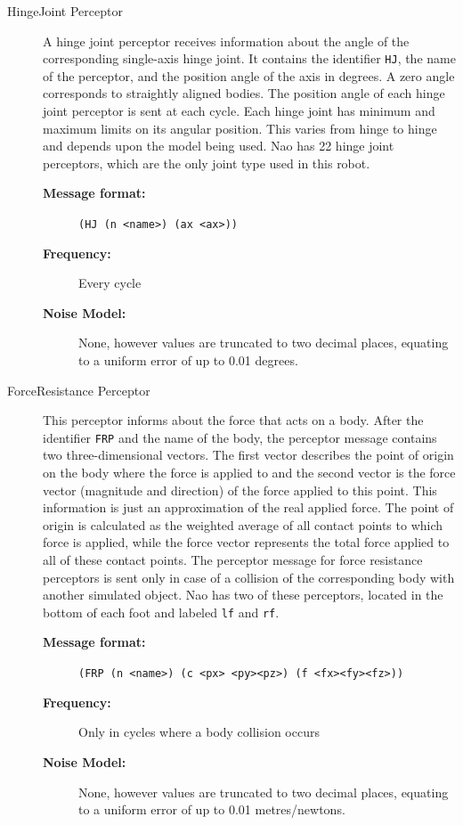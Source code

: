 \begin{description}
  \item [HingeJoint Perceptor]
  A hinge joint perceptor receives information about the angle of the corresponding single-axis hinge joint. It contains the identifier \texttt{HJ}, the name of the perceptor, and the position angle of the axis in degrees. A zero angle corresponds to straightly aligned bodies. The position angle of each hinge joint perceptor is sent at each cycle.
Each hinge joint has minimum and maximum limits on its angular position. This varies from hinge to hinge and depends upon the model being used. Nao has 22 hinge joint perceptors, which are the only joint type used in this robot.

 \begin{description}
  \item[{\bf Message format:}]
  \texttt{(HJ (n <name>) (ax <ax>))}
  \item[{\bf Frequency:}]
  Every cycle
   \item[{\bf Noise Model:}] None, however values are truncated to two decimal places, equating to a uniform error of up to 0.01 degrees.
  \end{description}
  
  
  \item [ForceResistance Perceptor]
  This perceptor informs about the force that acts on a body.  After the identifier \texttt{FRP} and the name of the body, the perceptor message contains two three-dimensional vectors. The first vector describes the point of origin on the body where the force is applied to and the second vector is the force vector (magnitude and  direction) of the force applied to this point. This information is just an approximation of the real applied force. The point of origin is calculated as the weighted average of all contact points to which force is applied, while the force vector represents the total force applied to all of these contact points. The perceptor message for force resistance perceptors is sent only in case of a collision of the corresponding body with another simulated object. Nao has two of these perceptors, located in the bottom of each foot and labeled \texttt{lf} and \texttt{rf}.
 \begin{description}
  \item[{\bf Message format:}]
  \texttt{(FRP (n <name>) (c <px> <py><pz>) (f <fx><fy><fz>))}
  \item[{\bf Frequency:}]Only in cycles where a body collision occurs
  \item[{\bf Noise Model:}]
  None, however values are truncated to two decimal places, equating to a uniform error of up to 0.01 metres/newtons.
  \end{description}



\end{description}
